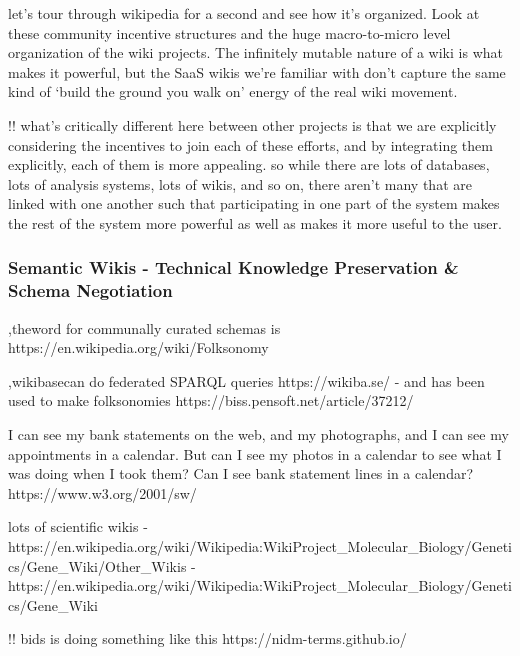 \documentclass{article}
\begin{document}
\begin{leftbar}
let's tour through wikipedia for a second and see how it's organized.
Look at these community incentive structures and the huge macro-to-micro
level organization of the wiki projects. The infinitely mutable nature
of a wiki is what makes it powerful, but the SaaS wikis we're familiar
with don't capture the same kind of `build the ground you walk on'
energy of the real wiki movement.
\end{leftbar}

!! what's critically different here between other projects is that we
are explicitly considering the incentives to join each of these efforts,
and by integrating them explicitly, each of them is more appealing. so
while there are lots of databases, lots of analysis systems, lots of
wikis, and so on, there aren't many that are linked with one another
such that participating in one part of the system makes the rest of the
system more powerful as well as makes it more useful to the user.

\hypertarget{semantic-wikis---technical-knowledge-preservation}{%
\subsubsection{Semantic Wikis - Technical Knowledge
Preservation \& Schema Negotiation}\label{semantic-wikis---technical-knowledge-preservation}}

\cite{kamelboulosSemanticWikisComprehensible2009},theword for communally curated schemas is
https://en.wikipedia.org/wiki/Folksonomy

\cite{goodSocialTaggingLife2009},wikibasecan do federated SPARQL queries https://wikiba.se/ - and has
been used to make folksonomies https://biss.pensoft.net/article/37212/

\begin{leftbar}
I can see my bank statements on the web, and my photographs, and I can
see my appointments in a calendar. But can I see my photos in a calendar
to see what I was doing when I took them? Can I see bank statement lines
in a calendar? https://www.w3.org/2001/sw/
\end{leftbar}

lots of scientific wikis -
https://en.wikipedia.org/wiki/Wikipedia:WikiProject\_Molecular\_Biology/Genetics/Gene\_Wiki/Other\_Wikis
-
https://en.wikipedia.org/wiki/Wikipedia:WikiProject\_Molecular\_Biology/Genetics/Gene\_Wiki


!! bids is doing something like this https://nidm-terms.github.io/
\end{document}
